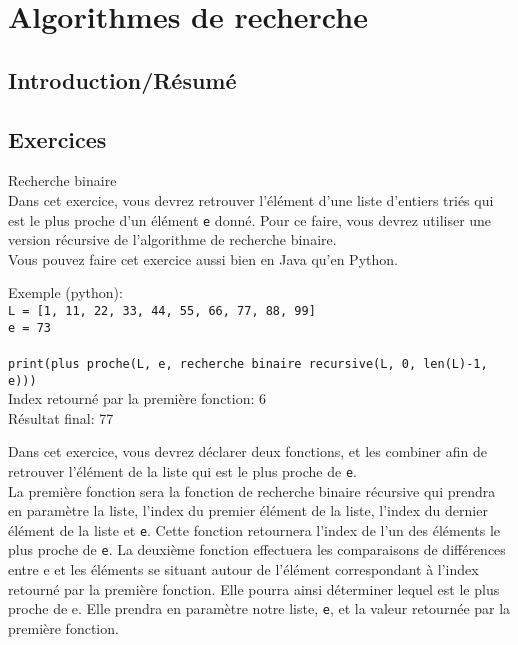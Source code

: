 \section{Algorithmes de recherche}

\subsection{Introduction/Résumé}

\subsection{Exercices}

\begin{Exercice}[20min] Recherche binaire \\

Dans cet exercice, vous devrez retrouver l'élément d'une liste d'entiers triés qui est le plus proche d'un élément \lstinline{e} donné. Pour ce faire, vous devrez utiliser une version récursive de l'algorithme de recherche binaire.\\

Vous pouvez faire cet exercice aussi bien en Java qu'en Python.

Exemple (python):\\

\lstinline{L = [1, 11, 22, 33, 44, 55, 66, 77, 88, 99]}\\
\lstinline{e = 73}\\\\
\lstinline{print(plus proche(L, e, recherche binaire recursive(L, 0, len(L)-1, e)))}\\

Index retourné par la première fonction: 6\\
Résultat final: 77\\


\begin{conseil}
   Dans cet exercice, vous devrez déclarer deux fonctions, et les combiner afin de retrouver l'élément de la liste qui est le plus proche de \lstinline{e}. \\
   
   La première fonction sera la fonction de recherche binaire récursive qui prendra en paramètre la liste, l'index du premier élément de la liste, l'index du dernier élément de la liste et \lstinline{e}. Cette fonction retournera l'index de l'un des éléments le plus proche de \lstinline{e}. 
   La deuxième fonction effectuera les comparaisons de différences entre e et les éléments se situant autour de l'élément correspondant à l'index retourné par la première fonction. Elle pourra ainsi déterminer lequel est le plus proche de e. Elle prendra en paramètre notre liste, \lstinline{e}, et la valeur retournée par la première fonction. \\
\end{conseil}


\end{Exercice}

